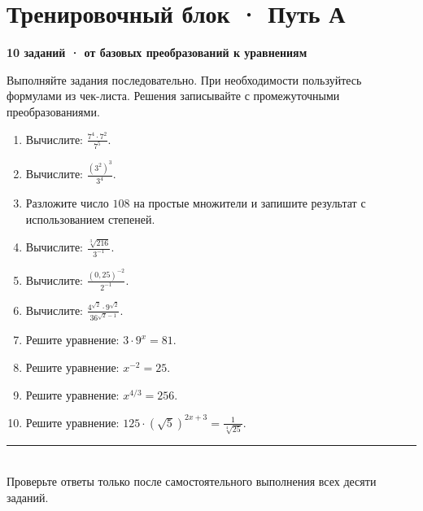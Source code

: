 \documentclass[a4paper,12pt]{article}
\begin{document}
\section*{Тренировочный блок · Путь А}
\textcolor{darkaccent}{\textbf{10 заданий · от базовых преобразований к уравнениям}}\par
Выполняйте задания последовательно. При необходимости пользуйтесь формулами из чек-листа. Решения записывайте с промежуточными преобразованиями.
\begin{enumerate}[label=\textbf{\arabic*.},itemsep=12pt,leftmargin=9mm]
\item Вычислите: \(\displaystyle \frac{7^4\cdot7^2}{7^5}.\)
\item Вычислите: \(\displaystyle \frac{(3^2)^3}{3^4}.\)
\item Разложите число \(108\) на простые множители и запишите результат с использованием степеней.
\item Вычислите: \(\displaystyle \frac{\sqrt[3]{216}}{3^{-1}}.\)
\item Вычислите: \(\displaystyle \frac{(0{,}25)^{-2}}{2^{-1}}.\)
\item Вычислите: \(\displaystyle \frac{4^{\sqrt2}\cdot9^{\sqrt2}}{36^{\sqrt2-1}}.\)
\item Решите уравнение: \(\displaystyle 3\cdot9^x=81.\)
\item Решите уравнение: \(\displaystyle x^{-2}=25.\)
\item Решите уравнение: \(\displaystyle x^{4/3}=256.\)
\item Решите уравнение: \(\displaystyle 125\cdot(\sqrt5)^{2x+3}=\frac1{\sqrt[4]{25}}.\)
\end{enumerate}
\vfill
\noindent\textcolor{darkaccent}{\rule{\linewidth}{0.5pt}}\\[-1mm]
{\small Проверьте ответы только после самостоятельного выполнения всех десяти заданий.}

\clearpage
\end{document}
